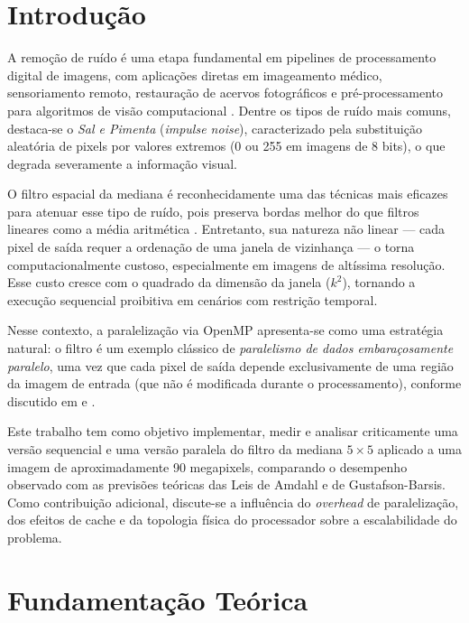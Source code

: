 \documentclass[12pt]{article}
\begin{document}
\newpage
\section{Introdução}

A remoção de ruído é uma etapa fundamental em pipelines de processamento digital de imagens, com aplicações diretas em imageamento médico, sensoriamento remoto, restauração de acervos fotográficos e pré-processamento para algoritmos de visão computacional \cite{gonzalez2010processamento}. Dentre os tipos de ruído mais comuns, destaca-se o \textit{Sal e Pimenta} (\textit{impulse noise}), caracterizado pela substituição aleatória de pixels por valores extremos (0 ou 255 em imagens de 8 bits), o que degrada severamente a informação visual.

O filtro espacial da mediana é reconhecidamente uma das técnicas mais eficazes para atenuar esse tipo de ruído, pois preserva bordas melhor do que filtros lineares como a média aritmética \cite{gonzalez2010processamento}. Entretanto, sua natureza não linear — cada pixel de saída requer a ordenação de uma janela de vizinhança — o torna computacionalmente custoso, especialmente em imagens de altíssima resolução. Esse custo cresce com o quadrado da dimensão da janela ($k^2$), tornando a execução sequencial proibitiva em cenários com restrição temporal.

Nesse contexto, a paralelização via OpenMP apresenta-se como uma estratégia natural: o filtro é um exemplo clássico de \textit{paralelismo de dados embaraçosamente paralelo}, uma vez que cada pixel de saída depende exclusivamente de uma região da imagem de entrada (que não é modificada durante o processamento), conforme discutido em \cite{eijkhout2022arthpc2} e \cite{burkardt2017imagedenoise}.

Este trabalho tem como objetivo implementar, medir e analisar criticamente uma versão sequencial e uma versão paralela do filtro da mediana $5 \times 5$ aplicado a uma imagem de aproximadamente 90 megapixels, comparando o desempenho observado com as previsões teóricas das Leis de Amdahl \cite{eijkhout2022arthpc1} e de Gustafson-Barsis. Como contribuição adicional, discute-se a influência do \textit{overhead} de paralelização, dos efeitos de cache e da topologia física do processador sobre a escalabilidade do problema.

\newpage
\section{Fundamentação Teórica}
\end{document}
